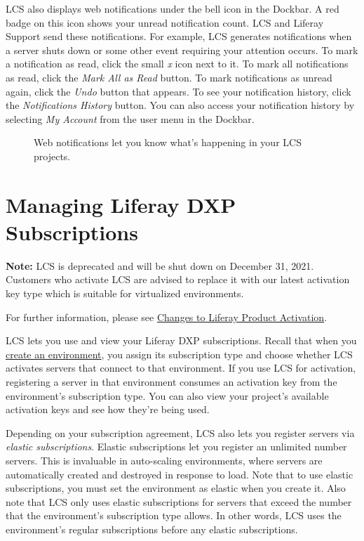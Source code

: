 LCS also displays web notifications under the bell icon in the Dockbar.
A red badge on this icon shows your unread notification count. LCS and
Liferay Support send these notifications. For example, LCS generates
notifications when a server shuts down or some other event requiring
your attention occurs. To mark a notification as read, click the small
\emph{x} icon next to it. To mark all notifications as read, click the
\emph{Mark All as Read} button. To mark notifications as unread again,
click the \emph{Undo} button that appears. To see your notification
history, click the \emph{Notifications History} button. You can also
access your notification history by selecting \emph{My Account} from the
user menu in the Dockbar.

\begin{figure}
\centering
{}
\caption{Web notifications let you know what's happening in your LCS
projects.}
\end{figure}

\chapter{Managing Liferay DXP
Subscriptions}\label{managing-liferay-dxp-subscriptions}

\noindent\hrulefill

\textbf{Note:} LCS is deprecated and will be shut down on December 31,
2021. Customers who activate LCS are advised to replace it with our
latest activation key type which is suitable for virtualized
environments.

For further information, please see
\href{https://help.liferay.com/hc/en-us/articles/4402347960845-Changes-to-Liferay-Product-Activation}{Changes
to Liferay Product Activation}.

\noindent\hrulefill

LCS lets you use and view your Liferay DXP subscriptions. Recall that
when you
\href{/docs/7-2/deploy/-/knowledge_base/d/managing-lcs-environments\#creating-environments}{create
an environment}, you assign its subscription type and choose whether LCS
activates servers that connect to that environment. If you use LCS for
activation, registering a server in that environment consumes an
activation key from the environment's subscription type. You can also
view your project's available activation keys and see how they're being
used.

Depending on your subscription agreement, LCS also lets you register
servers via \emph{elastic subscriptions}. Elastic subscriptions let you
register an unlimited number servers. This is invaluable in auto-scaling
environments, where servers are automatically created and destroyed in
response to load. Note that to use elastic subscriptions, you must set
the environment as elastic when you create it. Also note that LCS only
uses elastic subscriptions for servers that exceed the number that the
environment's subscription type allows. In other words, LCS uses the
environment's regular subscriptions before any elastic subscriptions.

